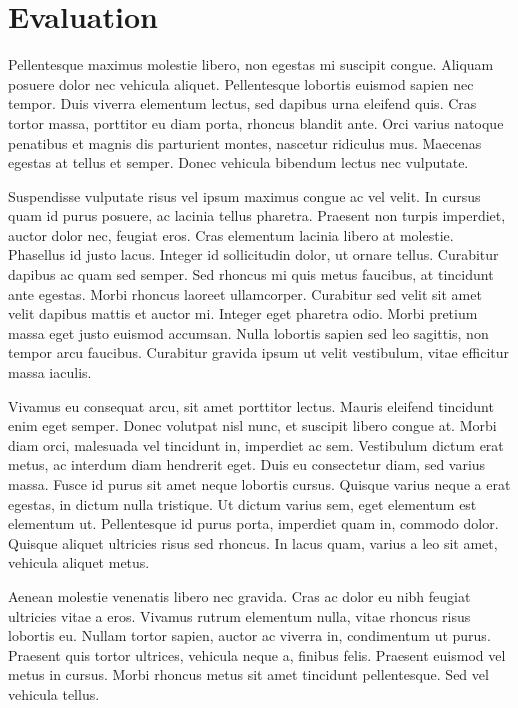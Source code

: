 \section{Evaluation}%
Pellentesque maximus molestie libero, non egestas mi suscipit congue. Aliquam posuere dolor nec vehicula aliquet. Pellentesque lobortis euismod sapien nec tempor. Duis viverra elementum lectus, sed dapibus urna eleifend quis. Cras tortor massa, porttitor eu diam porta, rhoncus blandit ante. Orci varius natoque penatibus et magnis dis parturient montes, nascetur ridiculus mus. Maecenas egestas at tellus et semper. Donec vehicula bibendum lectus nec vulputate.

Suspendisse vulputate risus vel ipsum maximus congue ac vel velit. In cursus quam id purus posuere, ac lacinia tellus pharetra. Praesent non turpis imperdiet, auctor dolor nec, feugiat eros. Cras elementum lacinia libero at molestie. Phasellus id justo lacus. Integer id sollicitudin dolor, ut ornare tellus. Curabitur dapibus ac quam sed semper. Sed rhoncus mi quis metus faucibus, at tincidunt ante egestas. Morbi rhoncus laoreet ullamcorper. Curabitur sed velit sit amet velit dapibus mattis et auctor mi. Integer eget pharetra odio. Morbi pretium massa eget justo euismod accumsan. Nulla lobortis sapien sed leo sagittis, non tempor arcu faucibus. Curabitur gravida ipsum ut velit vestibulum, vitae efficitur massa iaculis.

Vivamus eu consequat arcu, sit amet porttitor lectus. Mauris eleifend tincidunt enim eget semper. Donec volutpat nisl nunc, et suscipit libero congue at. Morbi diam orci, malesuada vel tincidunt in, imperdiet ac sem. Vestibulum dictum erat metus, ac interdum diam hendrerit eget. Duis eu consectetur diam, sed varius massa. Fusce id purus sit amet neque lobortis cursus. Quisque varius neque a erat egestas, in dictum nulla tristique. Ut dictum varius sem, eget elementum est elementum ut. Pellentesque id purus porta, imperdiet quam in, commodo dolor. Quisque aliquet ultricies risus sed rhoncus. In lacus quam, varius a leo sit amet, vehicula aliquet metus.

Aenean molestie venenatis libero nec gravida. Cras ac dolor eu nibh feugiat ultricies vitae a eros. Vivamus rutrum elementum nulla, vitae rhoncus risus lobortis eu. Nullam tortor sapien, auctor ac viverra in, condimentum ut purus. Praesent quis tortor ultrices, vehicula neque a, finibus felis. Praesent euismod vel metus in cursus. Morbi rhoncus metus sit amet tincidunt pellentesque. Sed vel vehicula tellus. 
